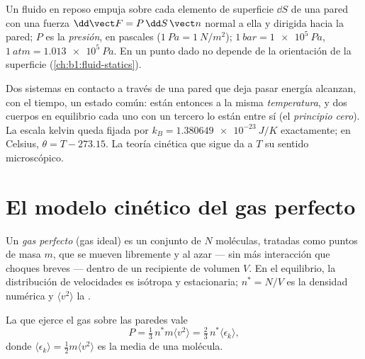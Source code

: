 \begin{definition}[Presión]\label{def:b1:kinetic-theory:pressure}
Un fluido en reposo empuja sobre cada elemento de superficie $\dd S$ de una
pared con una fuerza $\dd\vect F = P\,\dd S\,\vect n$ normal a ella y
dirigida hacia la pared; $P$ es la \emph{presión}, en pascales
($\qty{1}{Pa} = \qty{1}{N/m^2}$); $\qty{1}{bar}
= \qty{1e5}{Pa}$, $\qty{1}{atm} = \qty{1.013e5}{Pa}$. En un punto dado no
depende de la orientación de la superficie (\cref{ch:b1:fluid-statics}).
\end{definition}

\begin{definition}[Temperatura]\label{def:b1:kinetic-theory:temperature}
Dos sistemas en contacto a través de una pared que deja pasar energía
alcanzan, con el tiempo, un estado común: están entonces a la misma
\emph{temperatura}, y dos cuerpos en equilibrio cada uno con un tercero lo
están entre sí (el \emph{principio cero}). La escala kelvin queda fijada
por $k_B = \qty{1.380649e-23}{J/K}$ exactamente; en Celsius,
$\theta = T - 273.15$. La teoría cinética que sigue da a $T$ su sentido
microscópico.
\end{definition}

\section{El modelo cinético del gas perfecto}

\begin{definition}\label{def:b1:kinetic-theory:model}
Un \emph{gas perfecto} (gas ideal) es un conjunto de $N$ moléculas,
tratadas como puntos de masa $m$, que se mueven libremente y al azar ---
sin más interacción que choques breves --- dentro de un recipiente de
volumen $V$. En el equilibrio, la distribución de velocidades es isótropa
y estacionaria; $n^* = N/V$ es la densidad numérica y
$\langle v^2\rangle$ la .
\end{definition}

\begin{theorem}\label{thm:b1:kinetic-theory:pressure}
La  que ejerce el gas sobre las paredes vale
\[
P = \tfrac13\,n^*m\langle v^2\rangle = \tfrac23\,n^*\langle\epsilon_k\rangle ,
\]
donde $\langle\epsilon_k\rangle = \tfrac12 m\langle v^2\rangle$ es la  media de una molécula.
\end{theorem}

